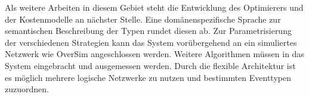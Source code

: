 Als weitere Arbeiten in diesem Gebiet steht die Entwicklung des Optimierers und der Kostenmodelle an nächster Stelle. Eine domänenspezifische Sprache zur semantischen Beschreibung der Typen rundet diesen ab. Zur Parametrisierung der verschiedenen Strategien kann das System vorübergehend an ein simuliertes Netzwerk wie OverSim \cite{Baumgart2007OverSim} angeschlossen werden. Weitere Algorithmen müssen in das System eingebracht und ausgemessen werden. Durch die flexible Architektur ist es möglich mehrere logische Netzwerke zu nutzen und bestimmten Eventtypen zuzuordnen.

